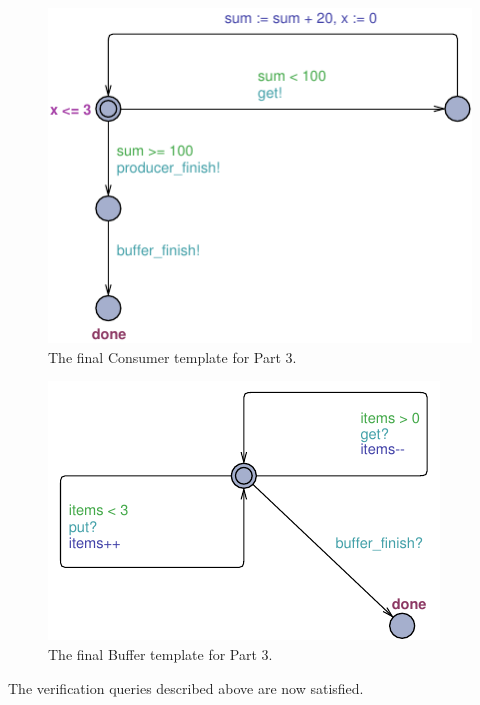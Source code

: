 \documentclass[a4paper,10pt]{article}
\begin{document}
\begin{figure}[h]
  \center
  \includegraphics{Part3ConsumerFixed.pdf}
  \caption{The final Consumer template for Part 3.}
  \label{img:part3consumerFixed}
\end{figure}

\begin{figure}[h]
  \center
  \includegraphics{Part3BufferFixed.pdf}
  \caption{The final Buffer template for Part 3.}
  \label{img:part3bufferFixed}
\end{figure}

The verification queries described above are now satisfied.
\end{document}
